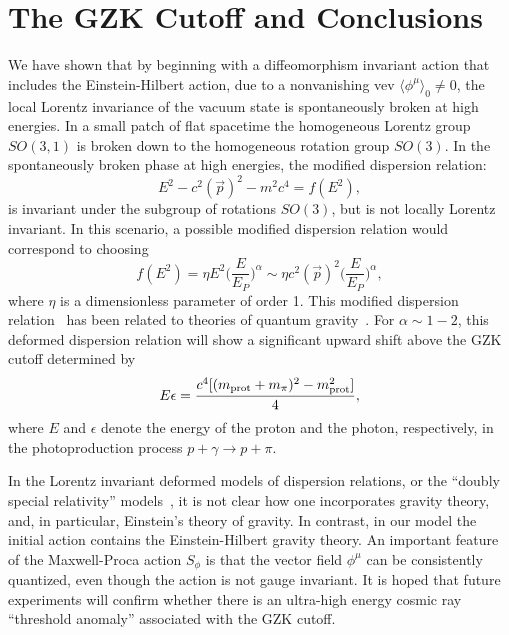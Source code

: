 \documentclass[a4paper,12pt]{article}
\begin{document}
{\section{\bf The GZK Cutoff and Conclusions}

We have shown that by beginning with a diffeomorphism invariant action that includes
the Einstein-Hilbert action, due to a nonvanishing vev
$\langle\phi^\mu\rangle_0\not=0$, the local Lorentz invariance of the vacuum state is
spontaneously broken at high energies. In a small patch of flat spacetime the
homogeneous Lorentz group $SO(3,1)$ is broken down to the homogeneous rotation group
$SO(3)$. In the spontaneously broken phase at high energies, the modified dispersion
relation:
\begin{equation}
E^2-c^2({\vec p})^2-m^2c^4=f(E^2),
\end{equation}
is invariant under the subgroup of rotations $SO(3)$, but is not locally
Lorentz invariant. In this scenario, a possible modified dispersion relation would
correspond to choosing
\begin{equation}
f(E^2)=\eta E^2\biggl(\frac{E}{E_P}\biggr)^\alpha\sim \eta c^2({\vec
p})^2\biggl(\frac{E}{E_P}\biggr)^\alpha,
\end{equation}
where $\eta$ is a dimensionless parameter of order 1. This modified dispersion
relation~\cite{Camelia,Piran} has been
related to theories of quantum gravity~\cite{Camelia,Smolin,Kifune}. For
$\alpha\sim 1-2$, this deformed dispersion relation will show a significant upward
shift above the GZK cutoff determined by
\begin{equation}
E\epsilon=\frac{c^4[(m_{\rm prot}+m_\pi)^2-m^2_{\rm prot}]}{4},
\end{equation}
where $E$ and $\epsilon$ denote the energy of the proton and the photon,
respectively, in the photoproduction process $p+\gamma\rightarrow p+\pi$.

In the Lorentz invariant deformed models of dispersion relations, or the ``doubly
special relativity'' models~\cite{Camelia2}, it is not clear how one incorporates
gravity theory, and, in particular, Einstein's theory of gravity.  In contrast, in
our model the initial action contains the Einstein-Hilbert gravity theory. An
important feature of the Maxwell-Proca action $S_\phi$ is that the vector field
$\phi^\mu$ can be consistently quantized, even though the action is not gauge
invariant. It is hoped that future experiments will confirm whether there is an
ultra-high energy cosmic ray ``threshold anomaly'' associated with the GZK cutoff.

}
\end{document}
